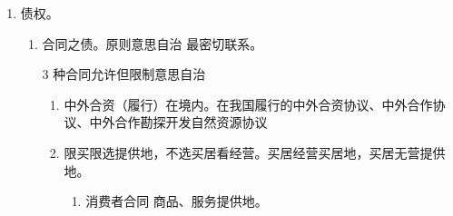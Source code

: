 \begin{enumerate}
\begin{enumerate}
                \begin{kk}{海商法关于船舶担保物权的规定}
                  \begin{enumerate}
                    \item 船舶担保物权。优先权 \dy 留置权 \dy 抵押权。
                          \begin{enumerate}
                            \item 法定担保物权。\yi 优先权（法律规定其内容和受偿顺序）。\er 留置权 \yjt 造船人、修船人。
                            \item 约定担保物权。抵押权。书面合同 + 登记对抗。
                          \end{enumerate}
                    \item 船舶优先权的内容和一般受偿顺序。资亡税救侵。
                          \begin{enumerate}
                            \item 船长、船员工资、劳动报酬。
                            \item 人身伤亡的赔偿请求。
                            \item 船舶的各种税费（吨税、引航费、港务费）。
                            \item 海难救助的给付请求。后发生的，可以插队排到第一位。
                            \item 侵权的财产赔偿请求。
                          \end{enumerate}
                  \end{enumerate}
                \end{kk}
        \end{enumerate}
  \item 债权。
        \begin{enumerate}
          \item 合同之债。原则意思自治 \yjt 最密切联系。
                \begin{kk}{3 种合同允许但限制意思自治}
                  \begin{enumerate}
                    \item 中外合资（履行）在境内。在我国履行的中外合资协议、中外合作协议、中外合作勘探开发自然资源协议
                    \item 限买限选提供地，不选买居看经营。买居经营买居地，买居无营提供地。
                          \begin{enumerate}
                            \item 消费者合同 \yjt 商品、服务提供地。

\end{enumerate}
\end{enumerate}
\end{kk}
\end{enumerate}
\end{enumerate}
